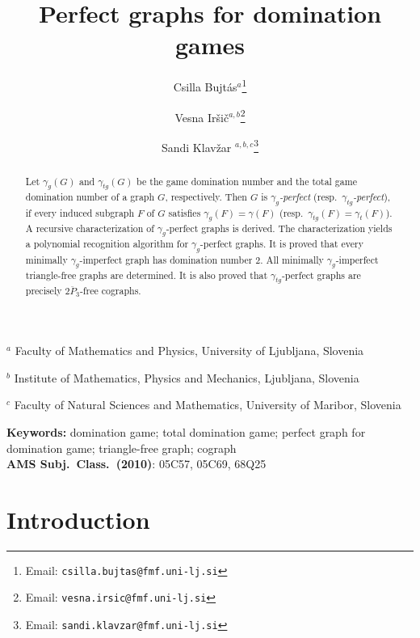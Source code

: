 \documentclass[12pt]{article}
\begin{document}
\title{Perfect graphs for domination games}

\author{Csilla Bujt\'as$^{a}$\thanks{Email: \texttt{csilla.bujtas@fmf.uni-lj.si}} 
\and Vesna Ir\v si\v c$^{a,b}$\thanks{Email: \texttt{vesna.irsic@fmf.uni-lj.si}}
\and Sandi Klav\v zar $^{a,b,c}$\thanks{Email: \texttt{sandi.klavzar@fmf.uni-lj.si}}
}
\maketitle

\begin{center}
$^a$ Faculty of Mathematics and Physics, University of Ljubljana, Slovenia\\
\medskip


$^b$ Institute of Mathematics, Physics and Mechanics, Ljubljana, Slovenia\\
\medskip

$^c$ Faculty of Natural Sciences and Mathematics, University of Maribor, Slovenia\\
\medskip
\end{center}

\begin{abstract}
Let $\gamma_g(G)$ and $\gamma_{tg}(G)$ be the game domination number and the total game domination number of a graph $G$, respectively. Then $G$ is \emph{$\gamma_g$-perfect} (resp.\ \emph{$\gamma_{tg}$-perfect}), if every induced subgraph $F$ of $G$ satisfies $\gamma_g(F)=\gamma(F)$ (resp.\ $\gamma_{tg}(F)=\gamma_t(F)$). A recursive characterization of $\gamma_g$-perfect graphs is derived. The characterization yields a polynomial recognition algorithm for $\gamma_g$-perfect graphs. It is proved that every minimally $\gamma_g$-imperfect graph has domination number $2$. All minimally $\gamma_g$-imperfect triangle-free graphs are determined. It is also proved that $\gamma_{tg}$-perfect graphs are precisely $\overline{2P_3}$-free cographs. 
\end{abstract}

\noindent
{\bf Keywords:} domination game; total domination game; perfect graph for domination game; triangle-free graph; cograph \\

\noindent
{\bf AMS Subj.\ Class.\ (2010)}: 05C57, 05C69, 68Q25


\section{Introduction}
\label{sec:intro}
\end{document}
